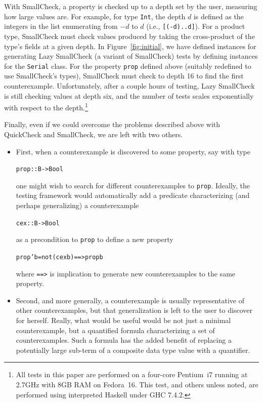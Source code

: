 \documentclass[10pt]{sigplanconf}
\newenvironment{code}{\begin{alltt}}{\end{alltt}}
\newcommand{\ttp}[1]{\texttt{#1}}
\begin{document}
With SmallCheck, a property is checked up to a depth set by the user, measuring
how large values are.  For example, for type \ttp{Int}, the depth $d$ is defined
as the integers in the list enumerating from $-d$ to $d$ (i.e.,
\ttp{[(-d)..d]}).  For a product type, SmallCheck must check values produced by
taking the cross-product of the type's fields at a given depth.  In
Figure~\ref{fig:initial}, we have defined instances for generating Lazy
SmallCheck (a variant of SmallCheck) tests by defining instances
for the \ttp{Serial} class.  For the property \ttp{prop} defined above (suitably
redefined to use SmallCheck's types), SmallCheck must check to depth 16 to find
the first counterexample.  Unfortunately, after a couple hours of testing, Lazy
SmallCheck is still checking values at depth six, and the number of tests scales
exponentially with respect to the depth.\footnote{All tests in this paper are
  performed on a four-core Pentium~i7 running at 2.7GHz with 8GB RAM on
  Fedora~16.  This test, and others unless noted, are performed using
  interpreted Haskell under GHC 7.4.2.}

Finally, even if we could overcome the problems described above with QuickCheck
and SmallCheck, we are left with two others.
\begin{itemize}
  \item First, when a counterexample is discovered to some property, say with
    type
%
\begin{code}
prop :: B -> Bool
\end{code}
%
\noindent
one might wish to search for different counterexamples to \ttp{prop}.  Ideally,
the testing framework would automatically add a predicate characterizing (and
perhaps generalizing) a counterexample
%
\begin{code}
cex :: B -> Bool
\end{code}
%
\noindent
as a precondition to \ttp{prop} to define a new property
\begin{code}
prop' b = not (cex b) ==> prop b
\end{code}
%
\noindent
where \ttp{==>} is implication to generate new counterexamples to the same property.

  \item Second, and more generally, a counterexample is usually representative
    of other counterexamples, but that generalization is left to the user to
    discover for herself.  Really, what would be useful would be not just a
    minimal counterexample, but a quantified formula characterizing a set of
    counterexamples.  Such a formula has the added benefit of replacing a
    potentially large sub-term of a composite data type value with a quantifier.
\end{itemize}
\end{document}
